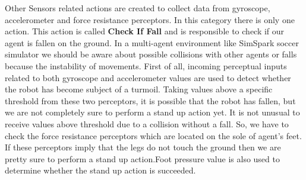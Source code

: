 Other Sensors related actions are created to collect data from gyroscope, accelerometer and force resistance perceptors. In this category there is only one action. This action is called {\bf Check If Fall} and is responsible to check if our agent is fallen on the ground. In a multi-agent environment like SimSpark soccer simulator we should be aware about possible collisions with other agents or falls because the instability of movements. First of all, incoming perceptual inputs related to both gyroscope and accelerometer values are used to detect whether the robot has become subject of a turmoil. Taking values above a specific threshold from these two perceptors, it is possible that the robot has fallen, but we are not completely sure to perform a stand up action yet. It is not unusual to receive values above threshold due to a collision without a fall. So, we have to check the force resistance perceptors which are located on the sole of agent's feet. If these perceptors imply that the legs do not touch the ground then we are pretty sure to perform a stand up action.Foot pressure value is also used to determine whether the stand up action is succeeded.



